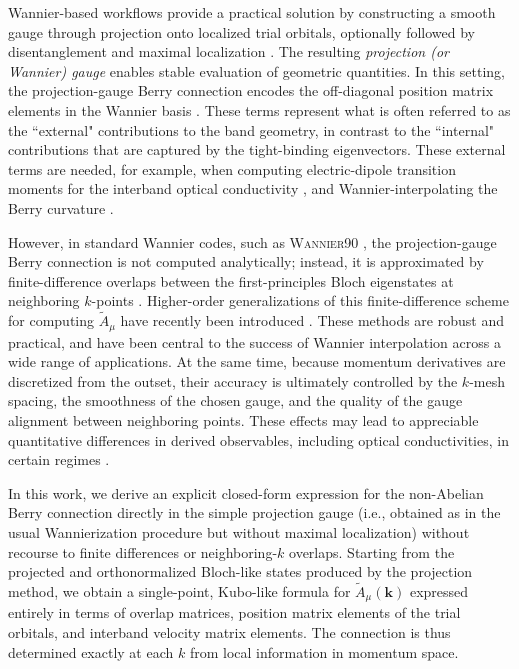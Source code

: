 \documentclass[galley,aps,pra,10pt,amsmath,amssymb,
    superscriptaddress,nofootinbib,longbibliography]{revtex4-2}
\begin{document}
Wannier-based workflows provide a practical solution by constructing a smooth gauge through projection onto localized trial orbitals, optionally followed by disentanglement and maximal localization \cite{marzari1997, souza2001, marzari2012}. The resulting \emph{projection (or Wannier) gauge} enables stable evaluation of geometric quantities. In this setting, the projection-gauge Berry connection encodes the off-diagonal position matrix elements in the Wannier basis \cite{xiao2010, Vanderbilt_2018}. These terms represent what is often referred to as the ``external" contributions to the band geometry, in contrast to the ``internal" contributions that are captured by the tight-binding eigenvectors. These external terms are needed, for example, when computing electric-dipole transition moments for the interband optical conductivity \cite{yates2007}, and Wannier-interpolating the Berry curvature \cite{wang2006}. 

However, in standard Wannier codes, such as \textsc{Wannier90} \cite{MOSTOFI20142309}, the projection-gauge Berry connection is not computed analytically; instead, it is approximated by finite-difference overlaps between the first-principles Bloch eigenstates at neighboring $k$-points \cite{marazzo2024, marzari1997}. Higher-order generalizations of this finite-difference scheme for computing $\tilde{A}_\mu$ have recently been introduced \cite{lihm2026}. These methods are robust and practical, and have been central to the success of Wannier interpolation across a wide range of applications. At the same time, because momentum derivatives are discretized from the outset, their accuracy is ultimately controlled by the $k$-mesh spacing, the smoothness of the chosen gauge, and the quality of the gauge alignment between neighboring points. These effects may lead to appreciable quantitative differences in derived observables, including optical conductivities, in certain regimes \cite{thummler2026}.

In this work, we derive an explicit closed-form expression for the non-Abelian Berry connection directly in the simple projection gauge (i.e., obtained as in the usual Wannierization procedure but without maximal localization) without recourse to finite differences or neighboring-$k$ overlaps. Starting from the projected and orthonormalized Bloch-like states produced by the projection method, we obtain a single-point, Kubo-like formula for $\tilde{A}_\mu(\mathbf{k})$ expressed entirely in terms of overlap matrices, position matrix elements of the trial orbitals, and interband velocity matrix elements. The connection is thus determined exactly at each $k$ from local information in momentum space. 
\end{document}
